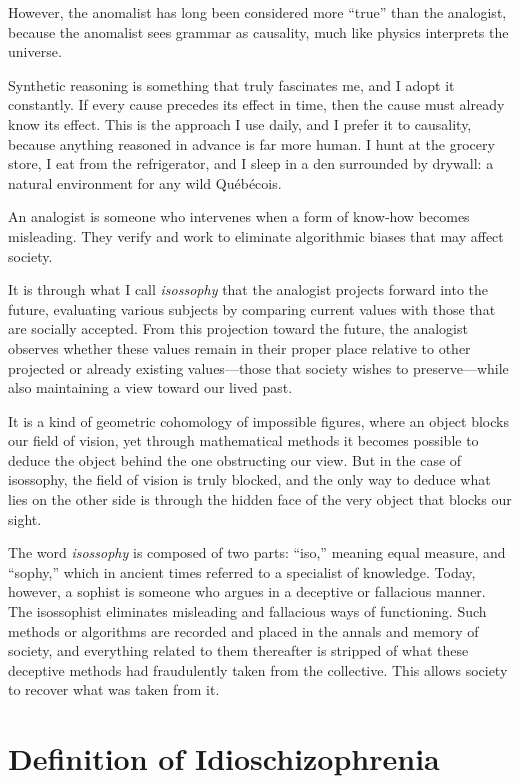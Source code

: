 \documentclass[12pt,oneside]{article}
\begin{document}
However, the anomalist has long been considered more “true” than the analogist, because the anomalist sees grammar as causality, much like physics interprets the universe.

Synthetic reasoning is something that truly fascinates me, and I adopt it constantly. If every cause precedes its effect in time, then the cause must already know its effect. This is the approach I use daily, and I prefer it to causality, because anything reasoned in advance is far more human. I hunt at the grocery store, I eat from the refrigerator, and I sleep in a den surrounded by drywall: a natural environment for any wild Québécois.

An analogist is someone who intervenes when a form of know‑how becomes misleading. They verify and work to eliminate algorithmic biases that may affect society.

It is through what I call \textit{isossophy} that the analogist projects forward into the future, evaluating various subjects by comparing current values with those that are socially accepted. From this projection toward the future, the analogist observes whether these values remain in their proper place relative to other projected or already existing values—those that society wishes to preserve—while also maintaining a view toward our lived past.

It is a kind of geometric cohomology of impossible figures, where an object blocks our field of vision, yet through mathematical methods it becomes possible to deduce the object behind the one obstructing our view. But in the case of isossophy, the field of vision is truly blocked, and the only way to deduce what lies on the other side is through the hidden face of the very object that blocks our sight.

The word \textit{isossophy} is composed of two parts: “iso,” meaning equal measure, and “sophy,” which in ancient times referred to a specialist of knowledge. Today, however, a sophist is someone who argues in a deceptive or fallacious manner. The isossophist eliminates misleading and fallacious ways of functioning. Such methods or algorithms are recorded and placed in the annals and memory of society, and everything related to them thereafter is stripped of what these deceptive methods had fraudulently taken from the collective. This allows society to recover what was taken from it.

\section{Definition of Idioschizophrenia}
\end{document}

